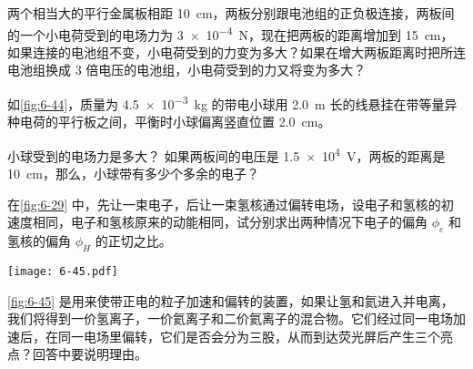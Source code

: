 \begin{Exercise}
\begin{question}
	\item 两个相当大的平行金属板相距 \qty{10}{cm}，两板分别跟电池组的正负极连接，两板间的一个小电荷受到的电场力为 \qty{3e-4}{N}，现在把两板的距离增加到 \qty{15}{cm}，如果连接的电池组不变，小电荷受到的力变为多大？如果在增大两板距离时把所连电池组换成 3 倍电压的电池组，小电荷受到的力又将变为多大？
	\item 如\cref{fig:6-44}，质量为 \qty{4.5e-3}{kg} 的带电小球用 \qty{2.0}{m} 长的线悬挂在带等量异种电荷的平行板之间，平衡时小球偏离竖直位置 \qty{2.0}{cm}。
	\begin{tasks}
		\task 小球受到的电场力是多大？
		\task 如果两板间的电压是 \qty{1.5e4}{V}，两板的距离是 \qty{10}{cm}，那么，小球带有多少个多余的电子？
	\end{tasks}
	\item 在\cref{fig:6-29} 中，先让一束电子，后让一束氢核通过偏转电场，设电子和氢核的初速度相同，电子和氢核原来的动能相同，试分别求出两种情况下电子的偏角 $\phi_e$ 和氢核的偏角 $\phi_H$ 的正切之比。
	\begin{figurehere}
		\begin{minipage}{\linewidth}\centering
			\texttt{[image: 6-45.pdf]}
			\caption{}\label{fig:6-45}
		\end{minipage}
	\end{figurehere}
	\item \cref{fig:6-45} 是用来使带正电的粒子加速和偏转的装置，如果让氢和氦进入并电离，我们将得到一价氢离子，一价氦离子和二价氦离子的混合物。它们经过同一电场加速后，在同一电场里偏转，它们是否会分为三股，从而到达荧光屏后产生三个亮点？回答中要说明理由。
\end{question}
\end{Exercise}
